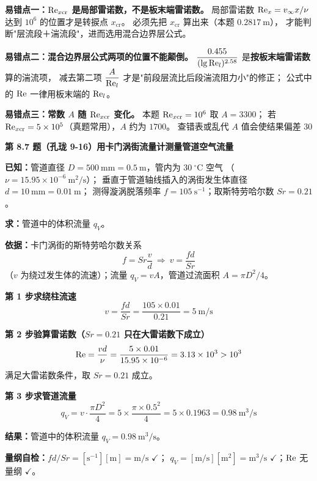 \begin{yicuo}
\textbf{易错点一：$\mathrm{Re}_{x\mathrm{cr}}$ 是局部雷诺数，不是板末端雷诺数。}
局部雷诺数 $\mathrm{Re}_x=v_\infty x/\nu$ 达到 $10^{6}$ 的位置才是转捩点 $x_{\mathrm{cr}}$。
必须先把 $x_{\mathrm{cr}}$ 算出来（本题 $0.2817\ \mathrm{m}$），
才能判断"层流段＋湍流段"，进而选用混合边界层公式。

\textbf{易错点二：混合边界层公式两项的位置不能颠倒。}
$\dfrac{0.455}{(\lg\mathrm{Re}_l)^{2.58}}$ 是\textbf{按板末端雷诺数}算的湍流项，
减去第二项 $\dfrac{A}{\mathrm{Re}_l}$ 才是"前段层流比后段湍流阻力小"的修正；
公式中的 $\mathrm{Re}$ 一律用板末端的 $\mathrm{Re}_l$。

\textbf{易错点三：常数 $A$ 随 $\mathrm{Re}_{x\mathrm{cr}}$ 变化。}
本题 $\mathrm{Re}_{x\mathrm{cr}}=10^{6}$ 取 $A=3300$；
若 $\mathrm{Re}_{x\mathrm{cr}}=5\times10^{5}$（真题常用），$A$ 约为 $1700$。
查错表或乱代 $A$ 值会使结果偏差 30%
\end{yicuo}

\noindent\textbf{第 8.7 题（孔珑 9-16）\quad 用卡门涡街流量计测量管道空气流量}

\begin{jie}
\textbf{已知：}管道直径 $D=500\ \mathrm{mm}=0.5\ \mathrm{m}$，管内为 $30\ ^{\circ}\mathrm{C}$ 空气
（$\nu=15.95\times10^{-6}\ \mathrm{m^2/s}$）；
垂直于管道轴线插入的涡街发生体直径 $d=10\ \mathrm{mm}=0.01\ \mathrm{m}$；
测得漩涡脱落频率 $f=105\ \mathrm{s^{-1}}$；取斯特劳哈尔数 $Sr=0.21$。

\textbf{求：}管道中的体积流量 $q_V$。

\textbf{依据：}卡门涡街的斯特劳哈尔数关系
\[ f=Sr\frac{v}{d}\ \Longrightarrow\ v=\frac{fd}{Sr} \]
（$v$ 为绕过发生体的流速）；流量 $q_V=vA$，管道过流面积 $A=\pi D^{2}/4$。

\textbf{第 1 步\quad 求绕柱流速}
\[ v=\frac{fd}{Sr}=\frac{105\times0.01}{0.21}=5\ \mathrm{m/s} \]

\textbf{第 2 步\quad 验算雷诺数（$Sr=0.21$ 只在大雷诺数下成立）}
\[ \mathrm{Re}=\frac{vd}{\nu}=\frac{5\times0.01}{15.95\times10^{-6}}=3.13\times10^{3}>10^{3} \]
满足大雷诺数条件，取 $Sr=0.21$ 成立。

\textbf{第 3 步\quad 求管道流量}
\[ q_V=v\cdot\frac{\pi D^{2}}{4}=5\times\frac{\pi\times0.5^{2}}{4}
=5\times0.1963=0.98\ \mathrm{m^3/s} \]

\textbf{结果：}管道中的体积流量 $q_V=0.98\ \mathrm{m^3/s}$。

\textbf{量纲自检：}$fd/Sr=[\mathrm{s^{-1}}][\mathrm{m}]=\mathrm{m/s}$ $\checkmark$；
$q_V=[\mathrm{m/s}][\mathrm{m^2}]=\mathrm{m^3/s}$ $\checkmark$；$\mathrm{Re}$ 无量纲 $\checkmark$。
\end{jie}

